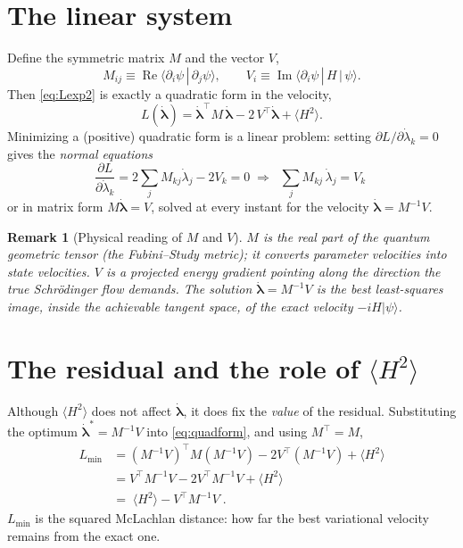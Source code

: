 \documentclass[12pt,a4paper]{article}
\newcommand{\ket}[1]{\lvert #1 \rangle}
\newcommand{\braket}[2]{\langle #1 \,|\, #2 \rangle}
\newcommand{\mel}[3]{\langle #1 \,|\, #2 \,|\, #3 \rangle}
\newcommand{\re}{\operatorname{Re}}
\newcommand{\im}{\operatorname{Im}}
\newcommand{\dlam}{\dot{\boldsymbol{\lambda}}}
\newtheorem{remark}{Remark}[section]
\begin{document}
\section{The linear system}\label{sec:linsys}

Define the symmetric matrix $M$ and the vector $V$,
\begin{equation}
  M_{ij}\equiv\re\braket{\partial_i\psi}{\partial_j\psi},
  \qquad
  V_i\equiv\im\mel{\partial_i\psi}{H}{\psi}.
  \label{eq:MVdef}
\end{equation}
Then \eqref{eq:Lexp2} is exactly a quadratic form in the velocity,
\begin{equation}
  L(\dlam)=\dlam^{\!\top}M\,\dlam-2\,V^{\!\top}\dlam+\langle H^2\rangle.
  \label{eq:quadform}
\end{equation}
Minimizing a (positive) quadratic form is a linear problem: setting
$\partial L/\partial\dot\lambda_k=0$ gives the \emph{normal equations}
\begin{equation}
  \frac{\partial L}{\partial\dot\lambda_k}
   =2\sum_j M_{kj}\dot\lambda_j-2V_k=0
   \;\Longrightarrow\;
   \boxed{\;\sum_j M_{kj}\,\dot\lambda_j=V_k\;}
  \label{eq:EOM}
\end{equation}
or in matrix form $M\dlam=V$, solved at every instant for the velocity $\dlam=M^{-1}V$.

\begin{remark}[Physical reading of $M$ and $V$]
$M$ is the real part of the quantum geometric tensor (the Fubini--Study metric); it converts
parameter velocities into state velocities. $V$ is a projected energy gradient pointing along the
direction the true Schr\"odinger flow demands. The solution $\dlam=M^{-1}V$ is the best
least-squares image, inside the achievable tangent space, of the exact velocity $-iH\ket{\psi}$.
\end{remark}

\section{The residual and the role of $\langle H^2\rangle$}\label{sec:residual}

Although $\langle H^2\rangle$ does not affect $\dlam$, it does fix the \emph{value} of the residual.
Substituting the optimum $\dlam^\ast=M^{-1}V$ into \eqref{eq:quadform}, and using $M^{\!\top}=M$,
\begin{align}
  L_{\min}
  &=(M^{-1}V)^{\!\top}M(M^{-1}V)-2V^{\!\top}(M^{-1}V)+\langle H^2\rangle\nonumber\\
  &=V^{\!\top}M^{-1}V-2V^{\!\top}M^{-1}V+\langle H^2\rangle\nonumber\\
  &=\boxed{\;\langle H^2\rangle-V^{\!\top}M^{-1}V\;}.
  \label{eq:residual}
\end{align}
$L_{\min}$ is the squared McLachlan distance: how far the best variational velocity remains from
the exact one.
\end{document}
